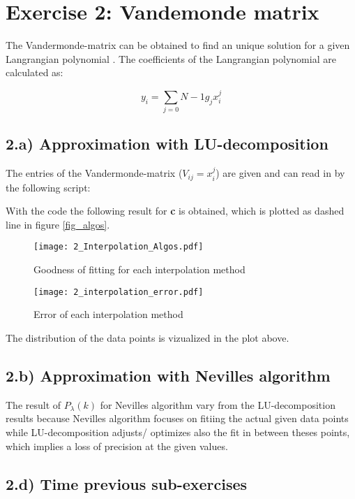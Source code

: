 \section{Exercise 2: Vandemonde matrix}

The Vandermonde-matrix can be obtained to find an unique solution for a given  Langrangian polynomial .
The coefficients of the Langrangian polynomial are calculated as:

\begin{equation}
	y_i = \sum_{j=0}{N-1} g_j x_i^j
\end{equation}

\subsection{2.a) Approximation with LU-decomposition}

The entries of the Vandermonde-matrix ($V_{ij} = x_i^j$) are given and can read in by the following script:
 


With the code the following result for \textbf{c} is obtained, which is plotted as dashed line in figure \ref{fig_algos}.


\begin{figure}
    \centering
    \texttt{[image: 2\_Interpolation\_Algos.pdf]}
    \caption{Goodness of fitting for each interpolation method}
    \label{fig:algos}
\end{figure}

\begin{figure}
    \centering
    \texttt{[image: 2\_interpolation\_error.pdf]}
    \caption{Error of each interpolation method}
    \label{fig:error}
\end{figure}

The distribution of the data points is vizualized in the plot above.

\subsection{2.b) Approximation with Nevilles algorithm}

The result of $P_{\lambda}(k)$ for Nevilles algorithm vary from the LU-decomposition results because Nevilles algorithm focuses on fitiing the actual given data points while LU-decomposition adjusts/ optimizes also the fit in between theses points, which implies a loss of precision at the given values.

\subsection{2.d) Time previous sub-exercises}

